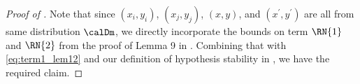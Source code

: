\begin{proof}[Proof of ]
    Note that since $(x_i,y_i)$, $(x_j ,y_j )$, $(x,y)$, and $(x^\prime, y^\prime)$ are all from same distribution $\calDm$, we directly incorporate the bounds on term $\RN{1}$ and $\RN{2}$ from the proof of Lemma 9 in \citet{bousquet2002stability}. Combining that with \eqref{eq:term1_lem12} and our definition of hypothesis stability in , we have the required claim. 
    
    

\end{proof}
